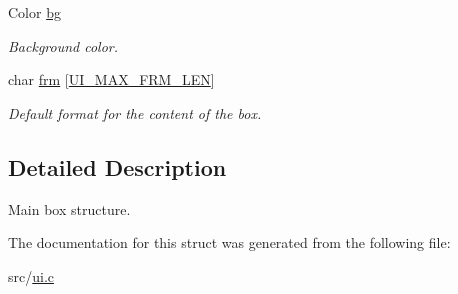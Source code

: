 \begin{DoxyCompactItemize}
$$Color \hyperlink{struct__Ui__box_a2562527c18b6318ba537faae8dd2d06c}{bg}
\begin{DoxyCompactList}\small\item\em Background color. \end{DoxyCompactList}\item 
\mbox{\label{struct__Ui__box_aaa5235adc2488f7f4ae651d8672c5c11}} 
char \hyperlink{struct__Ui__box_aaa5235adc2488f7f4ae651d8672c5c11}{frm} \mbox{[}\hyperlink{ui_8c_aab208380ff579bef5fd8b91fa0c0215a}{U\+I\+\_\+\+M\+A\+X\+\_\+\+F\+R\+M\+\_\+\+L\+EN}\mbox{]}
\begin{DoxyCompactList}\small\item\em Default format for the content of the box. \end{DoxyCompactList}\end{DoxyCompactItemize}


\subsection{Detailed Description}
Main box structure. 

The documentation for this struct was generated from the following file\+:\begin{DoxyCompactItemize}
\item 
src/\hyperlink{ui_8c}{ui.\+c}\end{DoxyCompactItemize}
